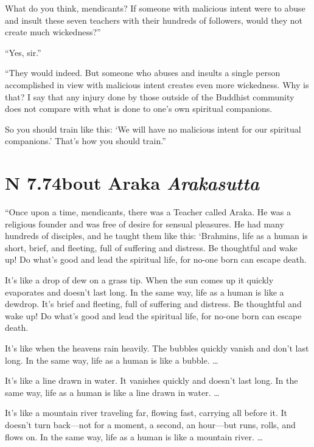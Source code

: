 \documentclass[12pt,openany]{book}%
\newcommand*{\suttatitleacronym}[1]{\smaller[2]{#1}\vspace*{.3em}}
\newcommand*{\suttatitletranslation}[1]{\linebreak{#1}}
\newcommand*{\suttatitleroot}[1]{\linebreak\smaller[2]\itshape{#1}}
\newcommand*{\tocacronym}[1]{\hspace*{-3.3em}{#1}\quad}
\newcommand*{\toctranslation}[1]{#1}
\newcommand*{\tocroot}[1]{(\textit{#1})}
\begin{document}
What do you think, mendicants? If someone with malicious intent were to abuse and insult these seven teachers with their hundreds of followers, would they not create much wickedness?” 

“Yes, sir.” 

“They would indeed. But someone who abuses and insults a single person accomplished in view with malicious intent creates even more wickedness. Why is that? I say that any injury done by those outside of the Buddhist community does not compare with what is done to one’s own spiritual companions. 

So you should train like this: ‘We will have no malicious intent for our spiritual companions.’ That’s how you should train.” 

%
\section*{{\suttatitleacronym AN 7.74}{\suttatitletranslation About Araka }{\suttatitleroot Arakasutta}}
\addcontentsline{toc}{section}{\tocacronym{AN 7.74} \toctranslation{About Araka } \tocroot{Arakasutta}}

“Once upon a time, mendicants, there was a Teacher called Araka. He was a religious founder and was free of desire for sensual pleasures. He had many hundreds of disciples, and he taught them like this: ‘Brahmins, life as a human is short, brief, and fleeting, full of suffering and distress. Be thoughtful and wake up! Do what’s good and lead the spiritual life, for no-one born can escape death. 

It’s like a drop of dew on a grass tip. When the sun comes up it quickly evaporates and doesn’t last long. In the same way, life as a human is like a dewdrop. It’s brief and fleeting, full of suffering and distress. Be thoughtful and wake up! Do what’s good and lead the spiritual life, for no-one born can escape death. 

It’s like when the heavens rain heavily. The bubbles quickly vanish and don’t last long. In the same way, life as a human is like a bubble. … 

It’s like a line drawn in water. It vanishes quickly and doesn’t last long. In the same way, life as a human is like a line drawn in water. … 

It’s like a mountain river traveling far, flowing fast, carrying all before it. It doesn’t turn back—not for a moment, a second, an hour—but runs, rolls, and flows on. In the same way, life as a human is like a mountain river. … 
\end{document}
